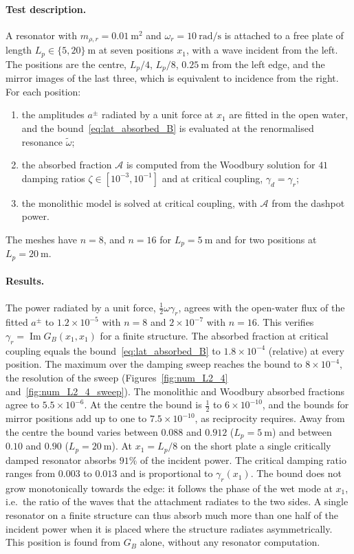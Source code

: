 {\paragraph{Test description.} A resonator with $m_{\rho,r}=0.01~\si{\meter\squared}$ and $\omega_r=10~\si{\radian\per\second}$ is attached to a free plate of length $L_p\in\{5,20\}~\si{\meter}$ at seven positions $x_1$, with a wave incident from the left. The positions are the centre, $L_p/4$, $L_p/8$, $0.25~\si{\meter}$ from the left edge, and the mirror images of the last three, which is equivalent to incidence from the right. For each position:
\begin{enumerate}
    \item the amplitudes $a^\pm$ radiated by a unit force at $x_1$ are fitted in the open water, and the bound~\eqref{eq:lat_absorbed_B} is evaluated at the renormalised resonance $\tilde\omega$;
    \item the absorbed fraction $\mathcal{A}$ is computed from the Woodbury solution for $41$ damping ratios $\zeta\in[10^{-3},10^{-1}]$ and at critical coupling, $\gamma_d=\gamma_r$;
    \item the monolithic model is solved at critical coupling, with $\mathcal{A}$ from the dashpot power.
\end{enumerate}
The meshes have $n=8$, and $n=16$ for $L_p=5~\si{\meter}$ and for two positions at $L_p=20~\si{\meter}$.

\paragraph{Results.} The power radiated by a unit force, $\tfrac12\omega\gamma_r$, agrees with the open-water flux of the fitted $a^\pm$ to $1.2\times10^{-5}$ with $n=8$ and $2\times10^{-7}$ with $n=16$. This verifies $\gamma_r=\operatorname{Im}G_B(x_1,x_1)$ for a finite structure. The absorbed fraction at critical coupling equals the bound~\eqref{eq:lat_absorbed_B} to $1.8\times10^{-4}$ (relative) at every position. The maximum over the damping sweep reaches the bound to $8\times10^{-4}$, the resolution of the sweep (Figures~\ref{fig:num_L2_4} and~\ref{fig:num_L2_4_sweep}). The monolithic and Woodbury absorbed fractions agree to $5.5\times10^{-6}$. At the centre the bound is $\tfrac12$ to $6\times10^{-10}$, and the bounds for mirror positions add up to one to $7.5\times10^{-10}$, as reciprocity requires. Away from the centre the bound varies between $0.088$ and $0.912$ ($L_p=5~\si{\meter}$) and between $0.10$ and $0.90$ ($L_p=20~\si{\meter}$). At $x_1=L_p/8$ on the short plate a single critically damped resonator absorbs $91\%$ of the incident power. The critical damping ratio ranges from $0.003$ to $0.013$ and is proportional to $\gamma_r(x_1)$. The bound does not grow monotonically towards the edge: it follows the phase of the wet mode at $x_1$, i.e.\ the ratio of the waves that the attachment radiates to the two sides. A single resonator on a finite structure can thus absorb much more than one half of the incident power when it is placed where the structure radiates asymmetrically. This position is found from $G_B$ alone, without any resonator computation.

}
